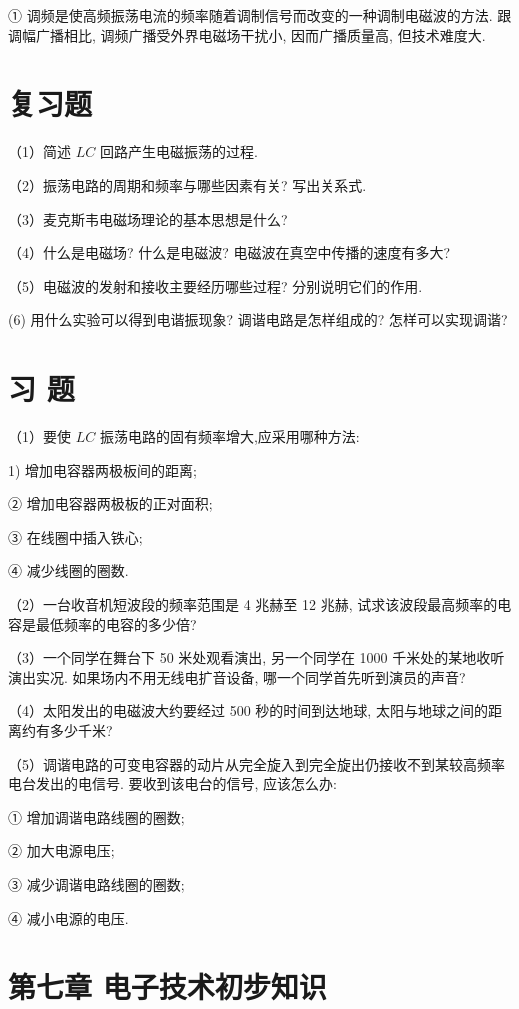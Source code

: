 \documentclass[10pt]{article}
\begin{document}
① 调频是使高频振荡电流的频率随着调制信号而改变的一种调制电磁波的方法. 跟调幅广播相比, 调频广播受外界电磁场干扰小, 因而广播质量高, 但技术难度大.

\section*{复习题}

（1）简述 \({LC}\) 回路产生电磁振荡的过程.

（2）振荡电路的周期和频率与哪些因素有关? 写出关系式.

（3）麦克斯韦电磁场理论的基本思想是什么?

（4）什么是电磁场? 什么是电磁波? 电磁波在真空中传播的速度有多大?

（5）电磁波的发射和接收主要经历哪些过程? 分别说明它们的作用.

(6) 用什么实验可以得到电谐振现象? 调谐电路是怎样组成的? 怎样可以实现调谐?

\section*{习 题}

（1）要使 \({LC}\) 振荡电路的固有频率增大,应采用哪种方法:

1) 增加电容器两极板间的距离;

② 增加电容器两极板的正对面积;

③ 在线圈中插入铁心;

④ 减少线圈的圈数.

（2）一台收音机短波段的频率范围是 4 兆赫至 12 兆赫, 试求该波段最高频率的电容是最低频率的电容的多少倍?

（3）一个同学在舞台下 50 米处观看演出, 另一个同学在 1000 千米处的某地收听演出实况. 如果场内不用无线电扩音设备, 哪一个同学首先听到演员的声音?

（4）太阳发出的电磁波大约要经过 500 秒的时间到达地球, 太阳与地球之间的距离约有多少千米?

（5）调谐电路的可变电容器的动片从完全旋入到完全旋出仍接收不到某较高频率电台发出的电信号. 要收到该电台的信号, 应该怎么办:

① 增加调谐电路线圈的圈数;

② 加大电源电压;

③ 减少调谐电路线圈的圈数;

④ 减小电源的电压.

\section*{第七章 电子技术初步知识}
\end{document}
